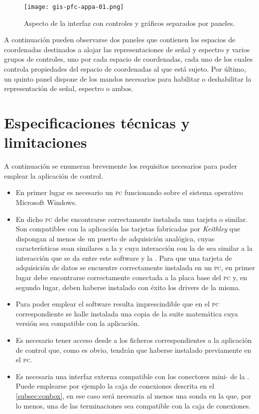 \begin{figure}
	\begin{center}
		\texttt{[image: gis-pfc-appa-01.png]}
	\end{center}
	\caption[Aspecto de la interfaz con controles y gráficos separados por paneles]{Aspecto de la interfaz con controles y gráficos separados por paneles.}
	\label{fig:interface}
\end{figure}

A continuación pueden observarse dos paneles que contienen los espacios de coordenadas destinados a alojar las representaciones de señal y espectro y varios grupos de controles, uno por cada espacio de coordenadas, cada uno de los cuales controla propiedades del espacio de coordenadas al que está sujeto. Por último, un quinto panel dispone de los mandos necesarios para habilitar o deshabilitar la representación de señal, espectro o ambos.


\section{Especificaciones técnicas y limitaciones}

A continuación se enumeran brevemente los requisitos necesarios para poder emplear la aplicación de control.

\begin{itemize}
	\item En primer lugar es necesario un \textsc{pc} funcionando sobre el sistema operativo Microsoft Windows.
	\item En dicho \textsc{pc} debe encontrarse correctamente instalada una tarjeta \kpci{} o similar. Son compatibles con la aplicación las tarjetas fabricadas por \emph{Keithley} que dispongan al menos de un puerto de adquisición analógica, cuyas características sean similares a la \kpci{} y cuya interacción con la \datx{} de \matlab{} sea similar a la interacción que se da entre este software y la \kpci{}. Para que una tarjeta de adquisición de datos se encuentre correctamente instalada en un \textsc{pc}, en primer lugar debe encontrarse correctamente conectada a la placa base del \textsc{pc} y, en segundo lugar, deben haberse instalado con éxito los drivers de la misma.
	\item Para poder emplear el software resulta imprescindible que en el \textsc{pc} correspondiente se halle instalada una copia de la suite matemática \matlab{} cuya versión sea compatible con la aplicación.
	\item Es necesario tener acceso desde \matlab{} a los ficheros correspondientes a la aplicación de control que, como es obvio, tendrán que haberse instalado previamente en el \textsc{pc}.
	\item Es necesaria una interfaz externa compatible con los conectores mini- de la \kpci{}. Puede emplearse por ejemplo la caja de conexiones descrita en el \vref{subsec:conbox}, en ese caso será necesaria al menos una sonda en la que, por lo menos, una de las terminaciones sea compatible con la caja de conexiones.
\end{itemize}

